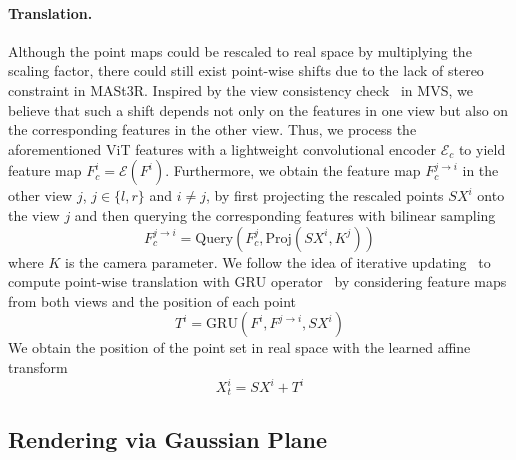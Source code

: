 \paragraph{Translation.} Although the point maps could be rescaled to real space by multiplying the scaling factor, there could still exist point-wise shifts due to the lack of stereo constraint in MASt3R. 
Inspired by the view consistency check~\cite{yan2020dense} in MVS, we believe that such a shift depends not only on the features in one view but also on the corresponding features in the other view. 
Thus, we process the aforementioned ViT features with a lightweight convolutional encoder $\mathcal{E}_c$ to yield feature map $F_c^i = \mathcal{E}(F^i)$. Furthermore, we obtain the feature map $F^{j \rightarrow i}_c$ in the other view $j$, $j \in \{ l, r \}$ and $i \neq j$, by first projecting the rescaled points $SX^i$ onto the view $j$ and then querying the corresponding features with bilinear sampling
\begin{equation}
    F^{j \rightarrow i}_c = \text{Query}(F^j_c , \text{Proj}(SX^i, K^j))
\end{equation}
where $K$ is the camera parameter.
We follow the idea of iterative updating~\cite{teed2020raft,lipson2021raft-stereo} to compute point-wise translation with $\text{GRU}$ operator~\cite{cho2014properties} by considering feature maps from both views and the position of each point
\begin{equation}
    T^i = \text{GRU}(F^i, F^{j \rightarrow i}, SX^i)
\end{equation}
We obtain the position of the point set in real space with the learned affine transform
\begin{equation}
    X_{t}^i = SX^i + T^i
\end{equation}

\subsection{Rendering via Gaussian Plane}
\label{sec:rendering}

